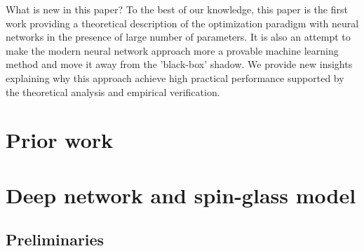 \documentclass[twoside]{article}
\begin{document}
What is new in this paper? To the best of our knowledge, this paper is the first work providing a theoretical description of the optimization paradigm with neural networks in the presence of large number of parameters. It is also an attempt to make the modern neural network approach more a provable machine learning method and move it away from the 'black-box' shadow. We provide new insights explaining why this approach achieve high practical performance supported by the theoretical analysis and empirical verification.

\section{Prior work}
\label{sec:PriorWork}




\section{Deep network and spin-glass model}
\label{sec:NNSG}

\subsection{Preliminaries}
\end{document}
